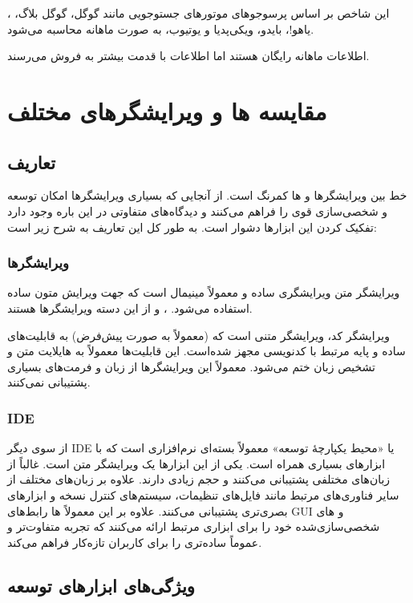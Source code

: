 \documentclass[a4paper]{article}
\begin{document}
این شاخص بر اساس پرسوجوهای موتورهای جستوجویی مانند گوگل، گوگل بلاگ، ، یاهو!، بایدو، ویکی‌پدیا و یوتیوب،
به صورت ماهانه محاسبه می‌شود.

اطلاعات ماهانه رایگان هستند اما اطلاعات با قدمت بیشتر به فروش می‌رسند.\cite{wp:tiobe}

\section{مقایسه ها و ویرایشگرهای مختلف}

\subsection{تعاریف}
خط بین ویرایشگرها و ها کمرنگ است. از آنجایی که بسیاری ویرایشگرها امکان توسعه
و شخصی‌سازی قوی را فراهم می‌کنند و دیدگاه‌های متفاوتی در این باره وجود دارد تفکیک
کردن این ابزارها دشوار است.
به طور کل این تعاریف به شرح زیر است:

\subsubsection{ویرایشگرها}
ویرایشگر متن ویرایشگری ساده و معمولاً مینیمال است
که جهت ویرایش متون ساده استفاده می‌شود. ،  و  از این دسته ویرایشگرها هستند.

ویرایشگر کد، ویرایشگر متنی است که (معمولاً به صورت پیش‌فرض) به قابلیت‌های ساده و پایه
مرتبط با کدنویسی مجهز شده‌است. این قابلیت‌ها معمولاً به هایلایت متن و تشخیص زبان ختم می‌شود.
معمولاً این ویرایشگرها از زبان و فرمت‌های بسیاری پشتیبانی نمی‌کنند.

\subsubsection{IDE}
از سوی دیگر IDE یا «محیط یکپارچهٔ توسعه» معمولاً بسته‌ای نرم‌افزاری است که با
ابزارهای بسیاری همراه است. یکی از این ابزار‌ها یک ویرایشگر متن است.
غالباً از زبان‌های مختلفی پشتیبانی می‌کنند و حجم زیادی
دارند. علاوه بر زبان‌های مختلف از سایر فناوری‌های مرتبط مانند فایل‌های تنظیمات، سیستم‌های کنترل نسخه و ابزارهای بصری‌تری پشتیبانی می‌کنند.
علاوه بر این معمولاً ها رابط‌های GUI و های شخصی‌سازی‌شده خود را برای ابزاری مرتبط ارائه می‌کنند که تجربه متفاوت‌تر و عموماً ساده‌تری را برای کاربران تازه‌کار فراهم می‌کند.

\subsection{ویژگی‌های ابزارهای توسعه}
\end{document}
